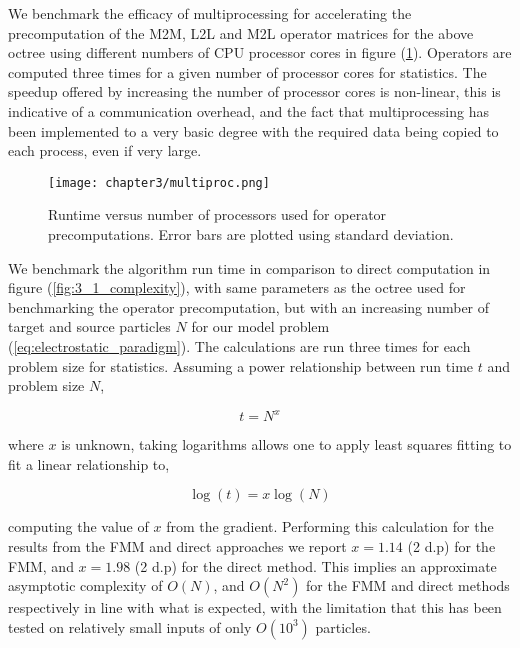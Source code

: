 We benchmark the efficacy of multiprocessing for accelerating the precomputation
of the \gls{M2M}, \gls{L2L} and \gls{M2L} operator matrices for the above octree
using different numbers of \gls{CPU} processor cores in figure (\ref{fig:3_1_multiproc}).
Operators are computed three times for a given number of processor cores
for statistics. The speedup offered by increasing the number of processor cores
is non-linear, this is indicative of a communication overhead, and the
fact that multiprocessing has been implemented to a very basic degree with
the required data being copied to each process, even if very large.

\begin{figure}[ht]
    \centering

  {\texttt{[image: chapter3/multiproc.png]}}
  \vspace{0pt}
    \caption{Runtime versus number of processors used for operator precomputations.
    Error bars are plotted using standard deviation.}
    \label{fig:3_1_multiproc}
\end{figure}

We benchmark the algorithm run time in comparison to direct computation in figure
(\ref{fig:3_1_complexity}), with same parameters as the octree used for benchmarking
the operator precomputation, but with an increasing number of target and source
particles $N$ for our model problem (\ref{eq:electrostatic_paradigm}). The
calculations are run three times for each problem size for statistics.
Assuming a power relationship between run time $t$ and problem size $N$,

\begin{equation}
    t = N^x
\end{equation}

where $x$ is unknown, taking logarithms allows one to apply least squares fitting
to fit a linear relationship to,

\begin{equation}
    \log(t) = x \log(N)
\end{equation}

computing the value of $x$ from the gradient. Performing this calculation for the
results from the \gls{FMM} and direct approaches we report $x=1.14$ (2 d.p) for
the FMM, and $x=1.98$ (2 d.p) for the direct method. This implies an approximate
asymptotic complexity of $O(N)$, and $O(N^2)$ for the \gls{FMM} and direct methods
respectively in line with what is expected, with the limitation that this has
been tested on relatively small inputs of only $O(10^3)$ particles.

